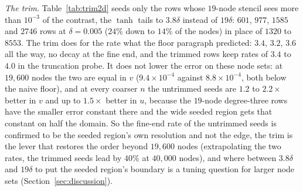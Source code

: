 \documentclass[11pt]{amsart}
\theoremstyle{definition}
\theoremstyle{remark}
\newcommand{\para}[1]{\par\smallskip\noindent\textit{#1}.\enspace}
\newcommand{\sci}[2]{\ensuremath{#1 \times 10^{#2}}}
\newcommand{\tablesetup}{\footnotesize\setlength{\tabcolsep}{2.5pt}%
  \renewcommand{\sci}[2]{\ensuremath{##1{\times}10^{##2}}}}
\begin{document}
\begin{table}
  \caption{The truncation probe on the curved geometry: relative
  $\ell^2$ error of the elastic operator applied to the reference state
  at $t = 1$, over the rows the seeds rebuild (for the naive operator and
  for the seeds) and over the remaining rows (the same $30$-node
  degree-four stencils in both operators), and the ratio of the seed
  rows' error to the bulk rows'.}
  \label{tab:truncation2d}
  \centering
  \tablesetup
  
\end{table}

\para{The trim}
Table~\ref{tab:trim2d} seeds only the rows whose $19$-node stencil sees
more than $10^{-3}$ of the contrast, the $\tanh$ tails to $3.8\delta$
instead of $19\delta$: $601$, $977$, $1585$ and $2746$ rows at
$\delta = 0.005$ ($24\%$ down to $14\%$ of the nodes) in place of $1320$
to $8553$. The trim does for the rate what the floor paragraph
predicted: $3.4$, $3.2$, $3.6$ all the way, no decay at the fine end, and
the trimmed rows keep rates of $3.4$ to $4.0$ in the truncation probe.
It does not lower the error on these node sets: at $19{,}600$ nodes the
two are equal in $v$ ($9.4 \times 10^{-4}$ against $8.8 \times 10^{-4}$,
both below the naive floor), and at every coarser $n$ the untrimmed
seeds are $1.2$ to $2.2\times$ better in $v$ and up to $1.5\times$
better in $u$, because the $19$-node degree-three rows have the smaller
error constant there and the wide seeded region gets that constant on
half the domain. So the fine-end rate of the untrimmed seeds is
confirmed to be the seeded region's own resolution and not the edge, the
trim is the lever that restores the order beyond $19{,}600$ nodes
(extrapolating the two rates, the trimmed seeds lead by $40\%$ at
$40{,}000$ nodes), and where between $3.8\delta$ and $19\delta$ to put the
seeded region's boundary is a tuning question for larger node sets
(Section~\ref{sec:discussion}).

\begin{table}
  \caption{The trimmed seeds through curved edges of width
  $\delta = 0.005$: relative $\ell^2$ error in $v$ at $t = 1$ and rates
  with the seeded rows trimmed to the stencils that see more than
  $10^{-3}$ of the contrast, against the naive scheme and the
  resolution floor. The untrimmed seeds are the $\delta = 0.005$ row of
  Table~\ref{tab:curved2d_v}.}
  \label{tab:trim2d}
  \centering
  \tablesetup
  
\end{table}
\end{document}
